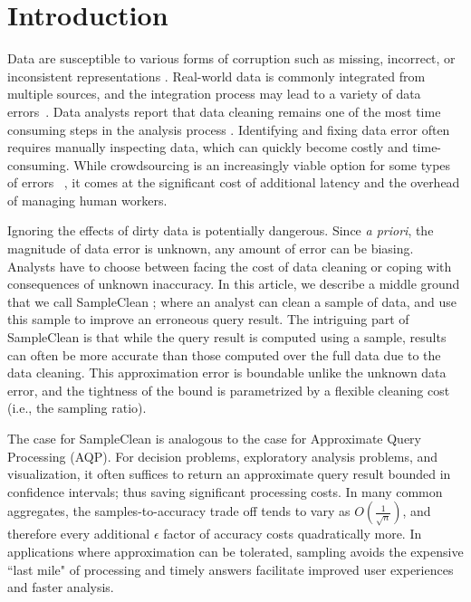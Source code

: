 \section{Introduction}
Data are susceptible to various forms of corruption such as missing,
incorrect, or inconsistent representations \cite{Gartner}.
Real-world data is commonly integrated from multiple sources, and the integration process may lead to a variety of data errors~\cite{DBLP:journals/pvldb/DongS13}. 
Data analysts report that data cleaning remains one of the most time
consuming steps in the analysis process \cite{nytimes}.
Identifying and fixing data error often requires manually inspecting data, which can quickly become costly and time-consuming. 
While crowdsourcing is an increasingly viable option for some types of errors ~\cite{DBLP:conf/sigmod/JefferyFH08,DBLP:journals/pvldb/FanLMTY10,DBLP:journals/pvldb/YakoutENOI11, gokhale2014corleone, park2014crowdfill, sampleclean,chu2015katara}, it comes at the significant cost of additional latency and the overhead of managing human workers. 

Ignoring the effects of dirty data is potentially dangerous.
Since \emph{a priori}, the magnitude of data error is unknown, any amount of error can be biasing.
Analysts have to choose between facing the cost of data cleaning
or coping with consequences of unknown inaccuracy.
In this article, we describe a middle ground that we call SampleClean \cite{wang1999sample, krishnan2015svc}; where an analyst can clean a sample of data, and use this sample to improve an erroneous query result.
The intriguing part of SampleClean is that while the query result is computed using a sample,                                   
results can often be more accurate than those computed over the full data due to the data cleaning.
This approximation error is boundable unlike the unknown data error, and the tightness of the bound is parametrized by a flexible cleaning cost (i.e., the sampling ratio).

The case for SampleClean is analogous to the case for Approximate Query Processing \cite{DBLP:conf/icde/OlkenR92, olken1993random, garofalakis2001approximate, AgarwalMPMMS13} (AQP).
For decision problems, exploratory analysis problems, and visualization, it often suffices to return an approximate query result bounded in confidence intervals; thus saving significant processing costs.
In many common aggregates, the samples-to-accuracy trade off tends to vary as $O(\frac{1}{\sqrt{n}})$, and therefore every additional $\epsilon$ factor of accuracy costs quadratically more. 
In applications where approximation can be tolerated, sampling avoids the expensive ``last mile" of processing and timely answers facilitate improved user experiences and faster analysis.

